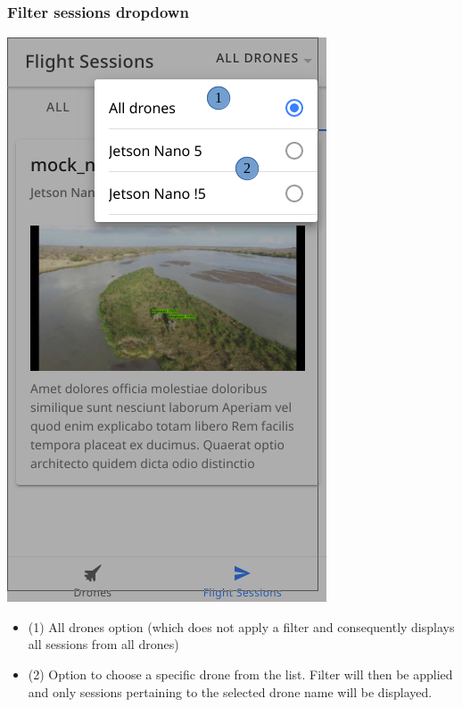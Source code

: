 \newpage
\subsubsection{Filter sessions dropdown}
\begin{minipage}[c]{0.5\linewidth}
	\centering
	\includegraphics[scale=0.4]{./assets/images/filter.png}
	\label{fig: sessionsPageFilter}
\end{minipage}
\begin{minipage}[c]{0.5\linewidth}
	\begin{itemize}
		\item (1) All drones option (which does not apply a filter and consequently displays all sessions from all drones)
		\item (2) Option to choose a specific drone from the list. Filter will then be applied and only sessions pertaining to the selected drone name will be displayed.
	\end{itemize}
\end{minipage}

